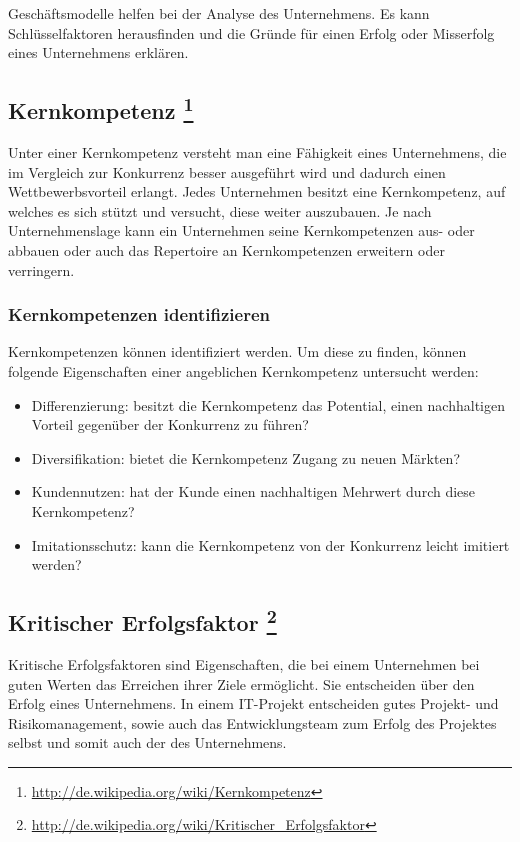 Geschäftsmodelle helfen bei der Analyse des Unternehmens. Es kann Schlüsselfaktoren herausfinden und die Gründe für einen Erfolg oder Misserfolg eines Unternehmens erklären.


\subsection[Kernkompetenz]{Kernkompetenz \footnote{\url{ http://de.wikipedia.org/wiki/Kernkompetenz}}}

Unter einer Kernkompetenz versteht man eine Fähigkeit eines Unternehmens, die im Vergleich zur Konkurrenz besser ausgeführt wird und dadurch einen Wettbewerbsvorteil erlangt. Jedes Unternehmen besitzt eine Kernkompetenz, auf welches es sich stützt und versucht, diese weiter auszubauen. Je nach Unternehmenslage kann ein Unternehmen seine Kernkompetenzen aus- oder abbauen oder auch das Repertoire an Kernkompetenzen erweitern oder verringern.
\subsubsection{Kernkompetenzen identifizieren}
Kernkompetenzen können identifiziert werden. Um diese zu finden, können folgende Eigenschaften einer angeblichen Kernkompetenz untersucht werden:
\begin{itemize}
\item Differenzierung: besitzt die Kernkompetenz das Potential, einen nachhaltigen Vorteil gegenüber der Konkurrenz zu führen?
\item Diversifikation: bietet die Kernkompetenz Zugang zu neuen Märkten?
\item Kundennutzen: hat der Kunde einen nachhaltigen Mehrwert durch diese Kernkompetenz?
\item Imitationsschutz: kann die Kernkompetenz von der Konkurrenz leicht imitiert werden?
\end{itemize}




\subsection[Kritischer Erfolgsfaktor]{Kritischer Erfolgsfaktor \footnote{\url{ http://de.wikipedia.org/wiki/Kritischer_Erfolgsfaktor}}}

Kritische Erfolgsfaktoren sind Eigenschaften, die bei einem Unternehmen bei guten Werten das Erreichen ihrer Ziele ermöglicht. Sie entscheiden über den Erfolg eines Unternehmens. In einem IT-Projekt entscheiden gutes Projekt- und Risikomanagement, sowie auch das Entwicklungsteam zum Erfolg des Projektes selbst und somit auch der des Unternehmens.



